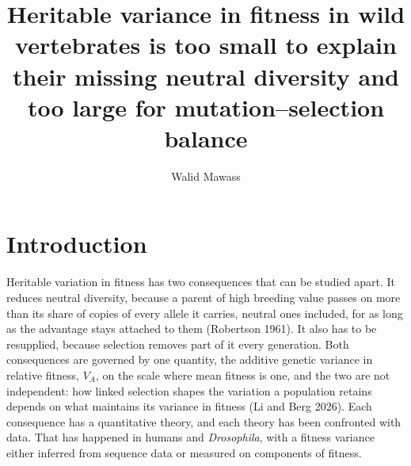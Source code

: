 \documentclass[12pt]{article}
\title{Heritable variance in fitness in wild vertebrates is too small to explain their missing neutral diversity and too large for mutation--selection balance}
\author{Walid Mawass}
\date{}
\begin{document}
\section{Introduction}
Heritable variation in fitness has two consequences that can be studied apart. It reduces neutral diversity, because a parent of high breeding value passes on more than its share of copies of every allele it carries, neutral ones included, for as long as the advantage stays attached to them (Robertson 1961). It also has to be resupplied, because selection removes part of it every generation. Both consequences are governed by one quantity, the additive genetic variance in relative fitness, $V_A$, on the scale where mean fitness is one, and the two are not independent: how linked selection shapes the variation a population retains depends on what maintains its variance in fitness (Li and Berg 2026). Each consequence has a quantitative theory, and each theory has been confronted with data. That has happened in humans and \textit{Drosophila}, with a fitness variance either inferred from sequence data or measured on components of fitness.
\end{document}
